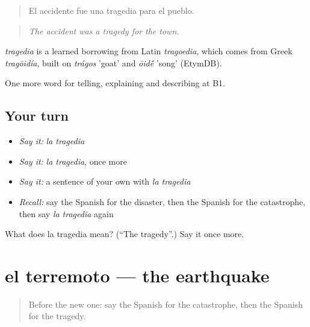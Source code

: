 \begin{quote}
El accidente fue una tragedia para el pueblo.
\end{quote}

\begin{quote}
\emph{The accident was a tragedy for the town.}
\end{quote}

\begin{cousinweb}
\emph{tragedia} is a learned borrowing from Latin \emph{tragoedia}, which comes from Greek \emph{tragōidía}, built on \emph{trágos} 'goat' and \emph{ōid\'{\={e}}} 'song' (EtymDB).
\end{cousinweb}

\begin{grammarlens}[title={What you've built}]
One more word for telling, explaining and describing at B1.
\end{grammarlens}

\subsection*{Your turn}
\begin{itemize}
\raggedright
  \item \emph{Say it:} \emph{la tragedia}
  \item \emph{Say it:} \emph{la tragedia}, once more
  \item \emph{Say it:} a sentence of your own with \emph{la tragedia}
  \item \emph{Recall:} say the Spanish for the disaster, then the Spanish for the catastrophe, then say \emph{la tragedia} again
\end{itemize}

\begin{tcolorbox}[breakable,colback=teal!4,colframe=teal!35!black,title={Before you move on}]
What does la tragedia mean? (\textquotedblleft{}The tragedy\textquotedblright{}.) Say it once more.
\end{tcolorbox}
\section[el terremoto]{el terremoto — the earthquake}

\label{lesson:ES-C528-terremoto}



\begin{quote}
Before the new one: say the Spanish for the catastrophe, then the Spanish for the tragedy.
\end{quote}

